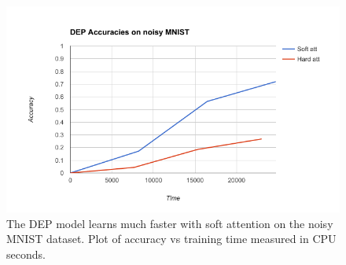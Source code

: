 
\begin{figure}
    \centering
    \includegraphics[scale=0.6]{resources/soft_vs_hard.png}
    \caption{The DEP model learns much faster with soft attention on the noisy MNIST dataset. Plot of accuracy vs training time measured in CPU seconds.}
    \label{fig:attention_mnist_graph}
\end{figure}
